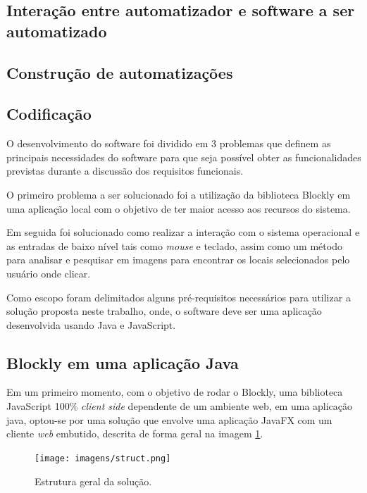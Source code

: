 \documentclass[tg]{mdtufsm}
\begin{document}
            \subsection {Interação entre automatizador e software a ser automatizado}

            \subsection {Construção de automatizações}

            \subsection {Codificação}

                O desenvolvimento do software foi dividido em 3 problemas que definem as principais necessidades do software para que seja possível obter as funcionalidades previstas durante a discussão dos requisitos funcionais.

                O primeiro problema a ser solucionado foi a utilização da biblioteca Blockly em uma aplicação local com o objetivo de ter maior acesso aos recursos do sistema.

                Em seguida foi solucionado como realizar a interação com o sistema operacional e as entradas de baixo nível tais como \emph{mouse} e teclado, assim como um método para analisar e pesquisar em imagens para encontrar os locais selecionados pelo usuário onde clicar.

                Como escopo foram delimitados alguns pré-requisitos necessários para utilizar a solução proposta neste trabalho, onde, o software deve ser uma aplicação desenvolvida usando Java e JavaScript.

                \subsection {Blockly em uma aplicação Java}

                Em um primeiro momento, com o objetivo de rodar o Blockly, uma biblioteca JavaScript 100\% \emph{client side} dependente de um ambiente web, em uma aplicação java, optou-se por uma solução que envolve uma aplicação JavaFX com um cliente \emph{web} embutido, descrita de forma geral na imagem \ref{fig:struct}.

                \begin{figure}[!htb]
                    {\centering
                    \texttt{[image: imagens/struct.png]}
                    \caption{Estrutura geral da solução.}
                    \label{fig:struct}}
                \end{figure}
\end{document}
